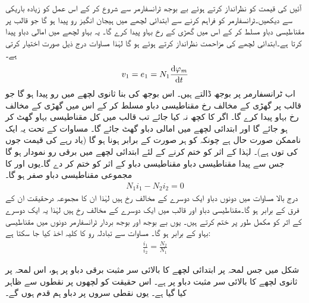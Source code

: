 آئیں  کی قیمت کو نظرانداز کرتے ہوئے بے بوجھ ٹرانسفارمر سے شروع کر کے اس عمل کو زیادہ باریکی سے دیکھیں۔ٹرانسفارمر کو  فراہم کرنے سے ابتدائی لچھے میں ہیجان انگیز رو  پیدا ہو گا جو قالب پر  مقناطیسی دباو مسلط  کر کے اس میں گھڑی کے رخ بہاو  پیدا کرے گا۔ یہ بہاو  لچھے میں امالی دباو  پیدا کرتا ہے۔ابتدائی لچھے کی مزاحمت نظرانداز کرتے ہوئے  ہو گا  لہٰذا  مساوات  درج ذیل صورت اختیار کرتی ہے۔
\begin{align}\label{مساوات_ٹرانسفارمر_دباو_برابر_بہاو_تفرق_ب}
v_1=e_1=N_1 \frac{\dif \varphi_m}{\dif t}
\end{align}
اب ٹرانسفارمر پر  بوجھ ڈالتے ہیں۔ اس بوجھ کی بنا ثانوی لچھے میں  رو پیدا ہو گا جو قالب پر گھڑی کے مخالف رخ مقناطیسی دباو  مسلط کر کے اس میں گھڑی کے مخالف رخ بہاو  پیدا کرے گا۔ اگر  کا کچھ نہ کیا جائے تب  قالب میں کل مقناطیسی بہاو گھٹ کر  ہو جائے گا اور ابتدائی لچھے میں امالی دباو گھٹ جائے گا۔ مساوات  کے تحت یہ ایک ناممکن صورت حال ہے چونکہ  کو ہر صورت  کے برابر ہونا ہو گا (یاد رہے  کی قیمت جوں کی توں ہے)۔ لہٰذا   کے اثر کو ختم کرنے کے لئے ابتدائی لچھے میں برقی رو  نمودار ہو گا جس سے پیدا مقناطیسی دباو  مقناطیسی دباو   کے اثر کو ختم کر دے گا۔یوں  اور  کا مجموعی مقناطیسی دباو صفر ہو گا۔
\begin{align}\label{مساوات_ٹرانسفارمر_رو_تناسب}
N_1 i_1-N_2 i_2=0
\end{align}
درج بالا مساوات میں دونوں دباو  ایک دوسرے کے مخالف  رخ ہیں لہٰذا ان کا مجموعہ درحقیقت ان کے فرق کے برابر ہو گا۔مقناطیسی دباو  اور  قالب میں ایک دوسرے کے مخالف رخ ہیں لہٰذا یہ ایک دوسرے کے اثر کو مکمل طور پر ختم کرتے ہیں۔ یوں بے بوجھ اور بوجھ بردار ٹرانسفارمر دونوں میں  مقناطیسی بہاو   کے برابر  ہو گا۔ مساوات  سے تبادلہ رو کا کلیہ اخذ کیا جا سکتا ہے:
\begin{align}\label{مساوات_ٹرانسفارمر_برقی_رو_اور_چکر_شرح}
\frac{i_1}{i_2}=\frac{N_2}{N_1}
\end{align}
%

شکل   میں جس لمحہ پر ابتدائی لچھے کا بالائی سر مثبت برقی دباو پر ہو، اس لمحہ پر ثانوی لچھے کا بالائی سر مثبت دباو پر ہے۔ اس حقیقت کو لچھوں پر نقطوں سے ظاہر کیا گیا ہے۔ یوں نقطی سروں پر دباو ہم قدم ہوں گے۔

